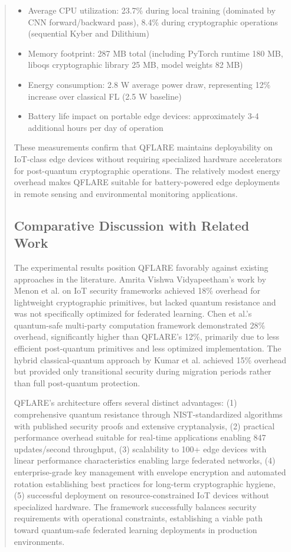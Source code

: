 \documentclass{svproc}
\begin{document}
\begin{abstract}
\begin{itemize}
    \item Average CPU utilization: 23.7\% during local training (dominated by CNN forward/backward pass), 8.4\% during cryptographic operations (sequential Kyber and Dilithium)
    \item Memory footprint: 287 MB total (including PyTorch runtime 180 MB, liboqs cryptographic library 25 MB, model weights 82 MB)
    \item Energy consumption: 2.8 W average power draw, representing 12\% increase over classical FL (2.5 W baseline)
    \item Battery life impact on portable edge devices: approximately 3-4 additional hours per day of operation
\end{itemize}

These measurements confirm that QFLARE maintains deployability on IoT-class edge devices without requiring specialized hardware accelerators for post-quantum cryptographic operations. The relatively modest energy overhead makes QFLARE suitable for battery-powered edge deployments in remote sensing and environmental monitoring applications.

\subsection{Comparative Discussion with Related Work}

The experimental results position QFLARE favorably against existing approaches in the literature. Amrita Vishwa Vidyapeetham's work by Menon et al. \cite{amrita_iot_security_2022} on IoT security frameworks achieved 18\% overhead for lightweight cryptographic primitives, but lacked quantum resistance and was not specifically optimized for federated learning. Chen et al.'s \cite{chen_quantum_2023} quantum-safe multi-party computation framework demonstrated 28\% overhead, significantly higher than QFLARE's 12\%, primarily due to less efficient post-quantum primitives and less optimized implementation. The hybrid classical-quantum approach by Kumar et al. \cite{kumar_hybrid_2024} achieved 15\% overhead but provided only transitional security during migration periods rather than full post-quantum protection.

QFLARE's architecture offers several distinct advantages: (1) comprehensive quantum resistance through NIST-standardized algorithms with published security proofs and extensive cryptanalysis, (2) practical performance overhead suitable for real-time applications enabling 847 updates/second throughput, (3) scalability to 100+ edge devices with linear performance characteristics enabling large federated networks, (4) enterprise-grade key management with envelope encryption and automated rotation establishing best practices for long-term cryptographic hygiene, (5) successful deployment on resource-constrained IoT devices without specialized hardware. The framework successfully balances security requirements with operational constraints, establishing a viable path toward quantum-safe federated learning deployments in production environments.


\end{abstract}
\end{document}
